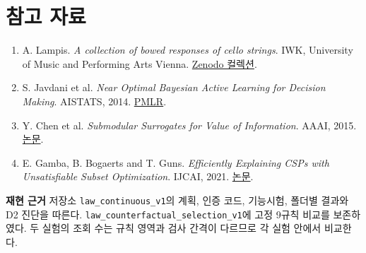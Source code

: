 \documentclass[11pt,a4paper]{article}
\newcommand{\lead}[1]{\textcolor{accent}{\sffamily\bfseries #1}}
\begin{document}
\section*{참고 자료}
\begin{enumerate}
\item A. Lampis. \textit{A collection of bowed responses of cello strings}. IWK, University of Music and Performing Arts Vienna. \href{https://zenodo.org/records/17749111}{Zenodo 컬렉션}.
\item S. Javdani et al. \textit{Near Optimal Bayesian Active Learning for Decision Making}. AISTATS, 2014. \href{https://proceedings.mlr.press/v33/javdani14.html}{PMLR}.
\item Y. Chen et al. \textit{Submodular Surrogates for Value of Information}. AAAI, 2015. \href{https://ojs.aaai.org/index.php/AAAI/article/view/9694}{논문}.
\item E. Gamba, B. Bogaerts and T. Guns. \textit{Efficiently Explaining CSPs with Unsatisfiable Subset Optimization}. IJCAI, 2021. \href{https://ijcai.org/proceedings/2021/191}{논문}.
\end{enumerate}

\noindent\lead{재현 근거}\quad
저장소 \texttt{law\_continuous\_v1}의 계획, 인증 코드, 기능시험, 폴더별 결과와 D2 진단을 따른다. \texttt{law\_counterfactual\_selection\_v1}에 고정 9규칙 비교를 보존하였다. 두 실험의 조회 수는 규칙 영역과 검사 간격이 다르므로 각 실험 안에서 비교한다.
\end{document}
